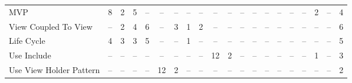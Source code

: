 \begin{table*}[t]
\begin{tabular}{@{}p{4cm}|p{.2cm}p{.2cm}p{.2cm}p{.2cm}p{.2cm}p{.2cm}p{.2cm}p{.2cm}p{.2cm}p{.4cm}p{.4cm}p{.4cm}p{.4cm}p{.4cm}p{.4cm}p{.4cm}p{.4cm}p{.4cm}|p{1.5cm}@{}}
MVP											& \multicolumn{1}{c}{8}		& \multicolumn{1}{c}{2}		& \multicolumn{1}{c}{5}	& \multicolumn{1}{c}{--}	& \multicolumn{1}{c}{--}	& \multicolumn{1}{c}{--}	& \multicolumn{1}{c}{--}	& \multicolumn{1}{c}{--}	& \multicolumn{1}{c}{--}	& \multicolumn{1}{c}{--}	& \multicolumn{1}{c}{--}	& \multicolumn{1}{c}{--}	& \multicolumn{1}{c}{--}	& \multicolumn{1}{c}{--}	& \multicolumn{1}{c}{--}	& \multicolumn{1}{c}{--}	& \multicolumn{1}{c}{2}	& \multicolumn{1}{c}{--} 		& \multicolumn{1}{|c}{4} \\
View Coupled To View						& \multicolumn{1}{c}{--}		& \multicolumn{1}{c}{2}		& \multicolumn{1}{c}{4}	& \multicolumn{1}{c}{6}	& \multicolumn{1}{c}{--}	& \multicolumn{1}{c}{3}	& \multicolumn{1}{c}{1}	& \multicolumn{1}{c}{2}	& \multicolumn{1}{c}{--}	& \multicolumn{1}{c}{--}	& \multicolumn{1}{c}{--}	& \multicolumn{1}{c}{--}	& \multicolumn{1}{c}{--}	& \multicolumn{1}{c}{--}	& \multicolumn{1}{c}{--}	& \multicolumn{1}{c}{--}	& \multicolumn{1}{c}{--}	& \multicolumn{1}{c}{--} 		& \multicolumn{1}{|c}{6} \\
Life Cycle									& \multicolumn{1}{c}{4}		& \multicolumn{1}{c}{3}		& \multicolumn{1}{c}{3}	& \multicolumn{1}{c}{5}	& \multicolumn{1}{c}{--}	& \multicolumn{1}{c}{--}	& \multicolumn{1}{c}{1}	& \multicolumn{1}{c}{--}	& \multicolumn{1}{c}{--}	& \multicolumn{1}{c}{--}	& \multicolumn{1}{c}{--}	& \multicolumn{1}{c}{--}	& \multicolumn{1}{c}{--}	& \multicolumn{1}{c}{--}	& \multicolumn{1}{c}{--}	& \multicolumn{1}{c}{--}	& \multicolumn{1}{c}{--}	& \multicolumn{1}{c}{--} 		& \multicolumn{1}{|c}{5} \\
Use Include									& \multicolumn{1}{c}{--}		& \multicolumn{1}{c}{--}		& \multicolumn{1}{c}{--}	& \multicolumn{1}{c}{--}	& \multicolumn{1}{c}{--}	& \multicolumn{1}{c}{--}	& \multicolumn{1}{c}{--}	& \multicolumn{1}{c}{--}	& \multicolumn{1}{c}{12}	& \multicolumn{1}{c}{2}	& \multicolumn{1}{c}{--}	& \multicolumn{1}{c}{--}	& \multicolumn{1}{c}{--}	& \multicolumn{1}{c}{--}	& \multicolumn{1}{c}{--}	& \multicolumn{1}{c}{--}	& \multicolumn{1}{c}{1}	& \multicolumn{1}{c}{--} 	& \multicolumn{1}{|c}{3} \\
Use View Holder Pattern						& \multicolumn{1}{c}{--}		& \multicolumn{1}{c}{--}		& \multicolumn{1}{c}{--}	& \multicolumn{1}{c}{--}	& \multicolumn{1}{c}{12}	& \multicolumn{1}{c}{2}	& \multicolumn{1}{c}{--}	& \multicolumn{1}{c}{--}	& \multicolumn{1}{c}{--}	& \multicolumn{1}{c}{--}	& \multicolumn{1}{c}{--}	& \multicolumn{1}{c}{--}	& \multicolumn{1}{c}{--}	& \multicolumn{1}{c}{--}	& \multicolumn{1}{c}{--}	& \multicolumn{1}{c}{--}	& \multicolumn{1}{c}{--}	& \multicolumn{1}{c}{--} 	& \multicolumn{1}{|c}{2} \\

\end{tabular}
\end{table*}
